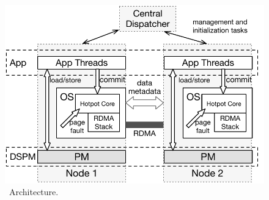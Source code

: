 {
\begin{figure}[th]
\begin{center}
\centerline{\includegraphics[width=\textwidth]{hotpot/Figures/architecture.pdf}}
\caption[\hotpot\ Architecture.]{\hotpot\ Architecture.}
\label{fig-architecture}
\end{center}
\end{figure}
}
